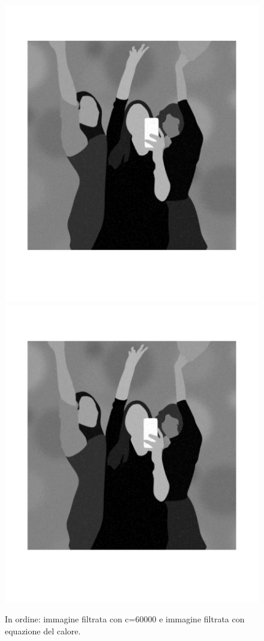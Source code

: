 \begin{figure}[htb] \centering
\includegraphics[scale=0.15,trim={0 3cm 0 5cm},clip]{Pictures/Esempi di utilizzo/Esempio 4/party_caso_limite_kappaalto.png}
\includegraphics[scale=0.15,trim={0 3cm 0 5cm},clip]{Pictures/Esempi di utilizzo/Esempio 4/party_caso_limite_eq_calore.png}
\caption{In ordine: immagine filtrata con c=60000 e immagine filtrata con equazione del calore.}\label{fig:figura}
\end{figure} 
